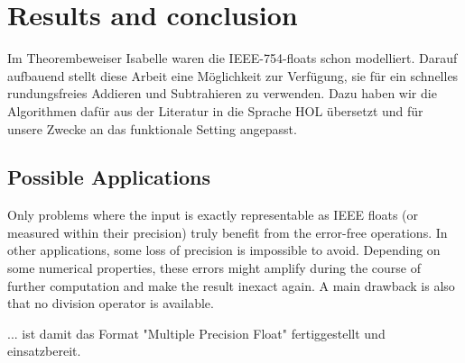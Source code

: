 \documentclass[11pt,a4paper]{article}
\begin{document}
\section{Results and conclusion}

Im Theorembeweiser Isabelle waren die IEEE-754-floats schon modelliert. Darauf aufbauend stellt diese Arbeit eine Möglichkeit zur Verfügung, sie für ein schnelles rundungsfreies Addieren und Subtrahieren zu verwenden. Dazu haben wir die Algorithmen dafür aus der Literatur in die Sprache HOL übersetzt und für unsere Zwecke an das funktionale Setting angepasst.

\subsection{Possible Applications}
Only problems where the input is exactly representable as IEEE floats (or measured within their precision) truly benefit from the error-free
operations. In other applications, some loss of precision is impossible to avoid. Depending on some numerical properties, these errors might amplify during the course of further computation and make the result inexact again. A main drawback is also that no division operator is available.


... ist damit das Format "Multiple Precision Float" fertiggestellt und einsatzbereit.

%
%
\end{document}
